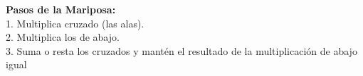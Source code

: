 \documentclass[12pt, letterpaper]{article}
\begin{document}
\begin{ejemplo}
\begin{center}
		\end{center}
		\vspace{0.2cm}
		\textbf{Pasos de la Mariposa:}\\
		1. Multiplica cruzado (las alas).\\
		2. Multiplica los de abajo.\\
		3. Suma o resta los cruzados y mantén el resultado de la multiplicación de abajo igual
	\end{ejemplo}
	
\end{document}
